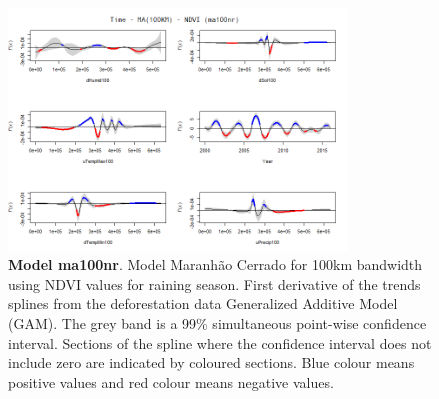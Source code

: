 \begin{table}

\begin{figure}[H]
 \centering
        \centering
        \includegraphics[width=0.8\textwidth]{ma100nr.png} %
        \caption[Model Cerrado Maranhão for 100km bandwidth using NDVI values for raining season. First derivative of the trends splines from the deforestation data Generalized Additive Model (GAM)]{\textbf{Model ma100nr}. Model Maranhão Cerrado for 100km bandwidth using NDVI values for raining season. First derivative of the trends splines from the deforestation data Generalized Additive Model (GAM). The grey band is a 99\% simultaneous point-wise confidence interval. Sections of the spline where the confidence interval does not include zero are indicated by coloured sections. Blue colour means positive values and red colour means negative values.}
\end{figure}
\end{table}

